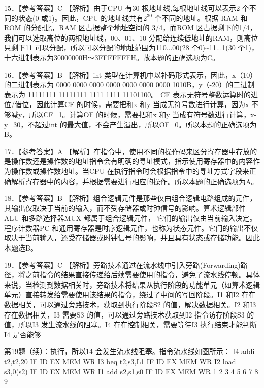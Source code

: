 \documentclass[UTF8,11pt]{ctexart}
\begin{document}
15．【参考答案】C 【解析】由于CPU 有30 根地址线,每根地址线可以表示2 个不同的状态(0 或1)。因此，CPU 的地址线共有\(\displaystyle 2^{30}\) 个不同的地址。根据 RAM 和ROM 的分配比，RAM 区占据整个地址空间的 3/4，而ROM 区占据剩下的1/4，我们可以选取高位的两根地址线，00、01、10 分配给连续低地址的RAM，则高位只剩下11 可以分配，所以可以分配的地址范围为110...00(28 个0)\textasciitilde{}11...1(30 个1)，十六进制表示为30000000H～3FFFFFFFH。故本题的正确选项为C。


16．【参考答案】B 【解析】int 类型在计算机中以补码形式表示，因此，x（10）的二进制表示为 0000 0000 0000 0000 0000 0000 0000 1010B，y（-20）的二进制表示为 11111111 11111111 1111 1111 11101100。 CF 表示无符号整数运算时的进位/借位，因此计算CF 的时候，需要把和x 和y 当成无符号数进行计算，因为x 不够减y，所以CF=1。计算OF 的时候，需要把和x 和y 当成有符号数进行计算，x-y=30，不超过int 的最大值，不会产生溢出，所以OF=0。所以本题的正确选项为B。


17．【参考答案】A 【解析】在指令中，使用不同的操作码来区分寄存器中存放的是操作数还是操作数的地址指令会有明确的寻址模式，指示使用寄存器中的内容作为操作数或操作数地址。当CPU 在执行指令时会根据指令中的寻址方式字段来正确解析寄存器中的内容，并根据需要进行相应的操作。所以本题的正确选项为A。


18．【参考答案】B 【解析】组合逻辑元件是那些仅由组合逻辑电路组成的元件，其输出仅取决于当前的输入，而不受存储器或时钟信号的影响。算术逻辑部件ALU 和多路选择器MUX 都属于组合逻辑元件， 它们的输出仅由当前输入决定。程序计数器PC 和通用寄存器是时序逻辑元件，也称为状态元件。它们的输出不仅取决于当前输入，还受存储器或时钟信号的影响，并且具有状态或存储功能。因此本题选B。


19．【参考答案】C 【解析】旁路技术通过在流水线中引入旁路(Forwarding)路径，将之前指令的结果直接传递给后续需要使用的指令，避免了流水线停顿。具体来说，当检测到数据相关时，旁路技术将结果从执行阶段的功能单元（如算术逻辑单元）直接转发给需要使用该结果的指令，绕过了中间的写回阶段。I1 和I2 存在数据相关，可以通过旁路技术，获取到执行阶段S2 的值，解决数据相关。I2 和I3 存在数据相关，I3 需要S3 的值，可以通过旁路技术获取到I2 指令访存阶段S3 的值，所以I3 发生流水线的阻塞。I4 存在控制相关，需要等待I3 执行结束才能判断I4 是否能够


第19题（续）：执行，所以14 会发生流水线阻塞。指令流水线如图所示： I4 addi t2,t2,20 IF ID EX MEM WR I3 beq t2,s3,L1 IF ID EX MEM WR I2 load s3,0(s2) IF ID EX MEM WR I1 add s2,s1,s0 IF ID EX MEM WR 1 2 3 4 5 6 7 8 9
\end{document}
